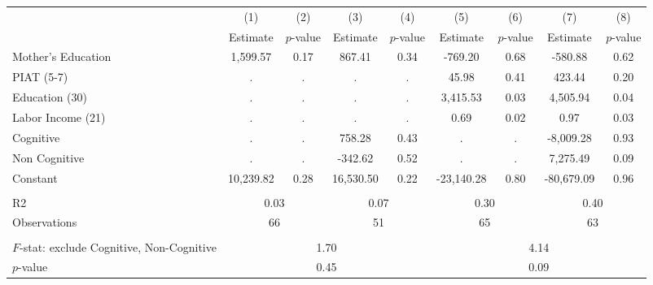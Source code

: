 \begin{tabular}{lcccccccc} \toprule
 & (1) & (2) & (3) & (4) & (5) & (6) & (7) & (8) \\
 & Estimate & $p$-value & Estimate & $p$-value  & Estimate & $p$-value  & Estimate & $p$-value  \\ \midrule 
Mother's Education &     1,599.57 &         0.17 &       867.41 &         0.34 &      -769.20 &         0.68 &      -580.88 &         0.62 \\  
PIAT (5-7) &            . &            . &            . &            . &        45.98 &         0.41 &       423.44 &         0.20 \\  
Education (30) &            . &            . &            . &            . &     3,415.53 &         0.03 &     4,505.94 &         0.04 \\  
Labor Income (21) &            . &            . &            . &            . &         0.69 &         0.02 &         0.97 &         0.03 \\  
Cognitive &            . &            . &       758.28 &         0.43 &            . &            . &    -8,009.28 &         0.93 \\  
Non Cognitive &            . &            . &      -342.62 &         0.52 &            . &            . &     7,275.49 &         0.09 \\  
Constant &    10,239.82 &         0.28 &    16,530.50 &         0.22 &   -23,140.28 &         0.80 &   -80,679.09 &         0.96 \\  \\ \midrule
R2 &         \multicolumn{2}{c}{0.03} &              \multicolumn{2}{c}{0.07} &             \multicolumn{2}{c}{0.30} &               \multicolumn{2}{c}{0.40}  \\  
Observations &         \multicolumn{2}{c}{66} &          \multicolumn{2}{c}{51} &              \multicolumn{2}{c}{65} &             \multicolumn{2}{c}{63}  \\  \\ \midrule
$F$-stat: exclude Cognitive, Non-Cognitive &              \multicolumn{4}{c}{1.70} &               \multicolumn{4}{c}{4.14}  \\  
$p$-value  &         \multicolumn{4}{c}{0.45} &                   \multicolumn{4}{c}{0.09} \\      \bottomrule \end{tabular}

